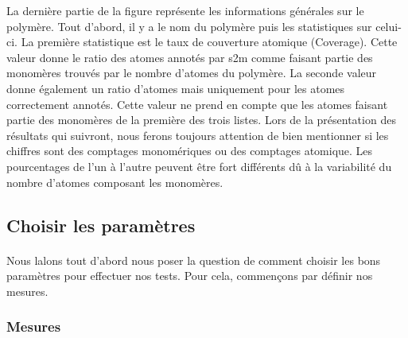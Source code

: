 \documentclass[12pt,french,twoside]{report}
\begin{document}
La dernière partie de la figure représente les informations générales sur le polymère.
Tout d'abord, il y a le nom du polymère puis les statistiques sur celui-ci.
La première statistique est le taux de couverture atomique (Coverage).
Cette valeur donne le ratio des atomes annotés par s2m comme faisant partie des monomères trouvés par le nombre d'atomes du polymère.
La seconde valeur donne également un ratio d'atomes mais uniquement pour les atomes correctement annotés.
Cette valeur ne prend en compte que les atomes faisant partie des monomères de la première des trois listes.
Lors de la présentation des résultats qui suivront, nous ferons toujours attention de bien mentionner si les chiffres sont des comptages monomériques ou des comptages atomique.
Les pourcentages de l'un à l'autre peuvent être fort différents dû à la variabilité du nombre d'atomes composant les monomères.





\subsection{Choisir les paramètres}

\paragraph{}Nous lalons tout d'abord nous poser la question de comment choisir les bons paramètres pour effectuer nos tests.
Pour cela, commençons par définir nos mesures.

\subsubsection{Mesures}
\end{document}
